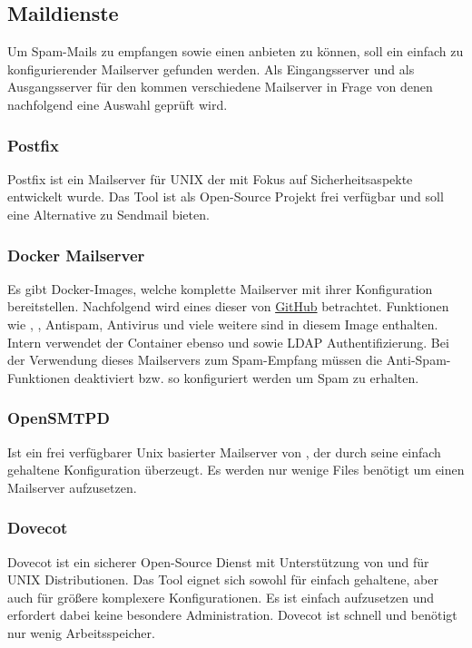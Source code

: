 \documentclass[a4paper,11pt,singlespacing]{article}
\begin{document}
	\subsection{Maildienste}\label{sec:Mailserver}
		Um Spam-Mails zu empfangen sowie einen  anbieten zu können, soll ein einfach zu konfigurierender Mailserver gefunden werden.
		Als Eingangsserver und als Ausgangsserver für den  kommen verschiedene Mailserver in Frage von denen nachfolgend eine Auswahl geprüft wird.

		\subsubsection{Postfix}\label{sec:Postfix}
			Postfix ist ein Mailserver für UNIX der mit Fokus auf Sicherheitsaspekte entwickelt wurde.
			Das Tool ist als Open-Source Projekt frei verfügbar und soll eine Alternative zu Sendmail bieten.
			\cite{postfix}

		\subsubsection{Docker Mailserver}\label{sec:FullstackDockerMailserver}
			Es gibt Docker-Images, welche komplette Mailserver mit ihrer Konfiguration bereitstellen.
			Nachfolgend wird eines dieser von \href{https://github.com/tomav/docker-mailserver}{GitHub} betrachtet.
			Funktionen wie , , Antispam, Antivirus und viele weitere sind in diesem Image enthalten.
			Intern verwendet der Container ebenso  und  sowie LDAP Authentifizierung.
			Bei der Verwendung dieses Mailservers zum Spam-Empfang müssen die Anti-Spam-Funktionen deaktiviert bzw. so konfiguriert werden um Spam zu erhalten.

		\subsubsection{OpenSMTPD}\label{sec:OpenSMTPD}
			Ist ein frei verfügbarer Unix basierter Mailserver von , der durch seine einfach gehaltene Konfiguration überzeugt.
			Es werden nur wenige Files benötigt um einen Mailserver aufzusetzen.
			\cite{openSMTPD}

		\subsubsection{Dovecot}\label{sec:Dovecot}
			Dovecot ist ein sicherer Open-Source Dienst mit Unterstützung von  und  für UNIX Distributionen.
			Das Tool eignet sich sowohl für einfach gehaltene, aber auch für grö{\ss}ere komplexere Konfigurationen.
			Es ist einfach aufzusetzen und erfordert dabei keine besondere Administration.
			Dovecot ist schnell und benötigt nur wenig Arbeitsspeicher. \cite{dovecot}
\end{document}
